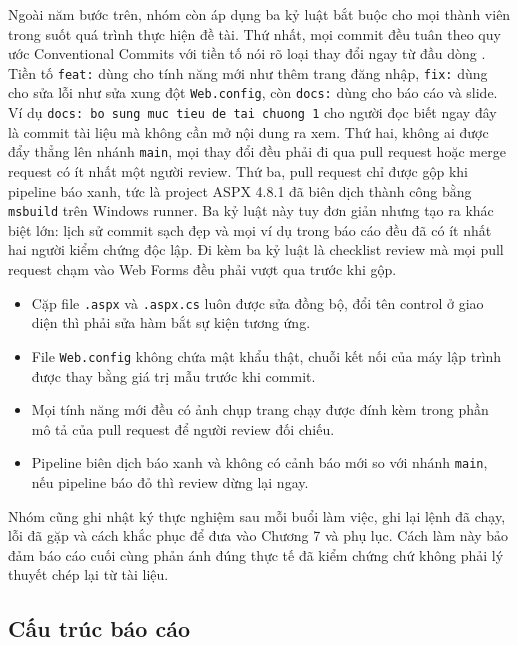 Ngoài năm bước trên, nhóm còn áp dụng ba kỷ luật bắt buộc cho mọi thành viên trong suốt quá trình thực hiện đề tài.
Thứ nhất, mọi commit đều tuân theo quy ước Conventional Commits với tiền tố nói rõ loại thay đổi ngay từ đầu dòng \cite{convcommits}.
Tiền tố \verb|feat:| dùng cho tính năng mới như thêm trang đăng nhập, \verb|fix:| dùng cho sửa lỗi như sửa xung đột \texttt{Web.config}, còn \verb|docs:| dùng cho báo cáo và slide.
Ví dụ \verb|docs: bo sung muc tieu de tai chuong 1| cho người đọc biết ngay đây là commit tài liệu mà không cần mở nội dung ra xem.
Thứ hai, không ai được đẩy thẳng lên nhánh \verb|main|, mọi thay đổi đều phải đi qua pull request hoặc merge request có ít nhất một người review.
Thứ ba, pull request chỉ được gộp khi pipeline báo xanh, tức là project ASPX 4.8.1 đã biên dịch thành công bằng \verb|msbuild| trên Windows runner.
Ba kỷ luật này tuy đơn giản nhưng tạo ra khác biệt lớn: lịch sử commit sạch đẹp và mọi ví dụ trong báo cáo đều đã có ít nhất hai người kiểm chứng độc lập.
Đi kèm ba kỷ luật là checklist review mà mọi pull request chạm vào Web Forms đều phải vượt qua trước khi gộp.
\begin{itemize}
\item Cặp file \texttt{.aspx} và \texttt{.aspx.cs} luôn được sửa đồng bộ, đổi tên control ở giao diện thì phải sửa hàm bắt sự kiện tương ứng.
\item File \texttt{Web.config} không chứa mật khẩu thật, chuỗi kết nối của máy lập trình được thay bằng giá trị mẫu trước khi commit.
\item Mọi tính năng mới đều có ảnh chụp trang chạy được đính kèm trong phần mô tả của pull request để người review đối chiếu.
\item Pipeline biên dịch báo xanh và không có cảnh báo mới so với nhánh \verb|main|, nếu pipeline báo đỏ thì review dừng lại ngay.
\end{itemize}
Nhóm cũng ghi nhật ký thực nghiệm sau mỗi buổi làm việc, ghi lại lệnh đã chạy, lỗi đã gặp và cách khắc phục để đưa vào Chương 7 và phụ lục.
Cách làm này bảo đảm báo cáo cuối cùng phản ánh đúng thực tế đã kiểm chứng chứ không phải lý thuyết chép lại từ tài liệu.

\subsection{Cấu trúc báo cáo}

